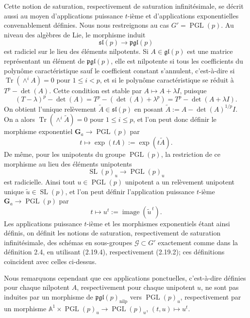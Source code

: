 \documentclass[11pt]{article}
\newcommand{\Ga}{\mathbf G_a}
\newcommand{\nilp}{\mathrm{nilp}}
\newcommand{\SL}{\operatorname{SL}}
\newcommand{\PGL}{\operatorname{PGL}}
\newcommand{\Tr}{\operatorname{Tr}}
\begin{document}
Cette notion de saturation, respectivement de saturation infinitésimale, se décrit aussi
au moyen d'applications puissance \(t\)-ième et d'applications exponentielles convenablement
définies. Nous nous restreignons au cas \(G'=\PGL(p)\). Au niveau des algèbres de Lie,
le morphisme induit
\begin{equation}
  \mathfrak{sl}(p)\longrightarrow\mathfrak{pgl}(p)
  \tag{2.19.1}
\end{equation}
est radiciel sur le lieu des éléments nilpotents. Si \(A\in\mathfrak{gl}(p)\) est une
matrice représentant un élément de \(\mathfrak{pgl}(p)\), elle est nilpotente si tous les
coefficients du polynôme caractéristique sauf le coefficient constant s'annulent, c'est-à-dire
si \(\Tr(\wedge^i A)=0\) pour \(1\le i<p\), et si le polynôme caractéristique se réduit
à \(T^p-\det(A)\). Cette condition est stable par \(A\mapsto A+\lambda I\), puisque
\[
  (T-\lambda)^p-\det(A)=T^p-(\det(A)+\lambda^p)=T^p-\det(A+\lambda I).
\]
On obtient l'unique relèvement \(\widetilde A\in\mathfrak{sl}(p)\) en posant
\(\widetilde A:=A-\det(A)^{1/p}I\). On a alors \(\Tr(\wedge^i\widetilde A)=0\) pour
\(1\le i\le p\), et l'on peut donc définir le morphisme exponentiel
\(\Ga\to\PGL(p)\) par
\begin{equation}
  t\longmapsto \exp(tA):=\exp(t\widetilde A).
  \tag{2.19.2}
\end{equation}
De même, pour les unipotents du groupe \(\PGL(p)\), la restriction de ce morphisme au
lieu des éléments unipotents
\begin{equation}
  \SL(p)_u\longrightarrow\PGL(p)_u
  \tag{2.19.3}
\end{equation}
est radicielle. Ainsi tout \(u\in\PGL(p)\) unipotent a un relèvement unipotent unique
\(\widetilde u\in\SL(p)\), et l'on peut définir l'application puissance \(t\)-ième
\(\Ga\to\PGL(p)\) par
\begin{equation}
  t\longmapsto u^t:=\operatorname{image}(\widetilde u^{\,t}).
  \tag{2.19.4}
\end{equation}
Les applications puissance \(t\)-ième et les morphismes exponentiels étant ainsi définis,
on définit les notions de saturation, respectivement de saturation infinitésimale, des
schémas en sous-groupes \(\mathcal G\subset G'\) exactement comme dans la définition 2.4,
en utilisant (2.19.4), respectivement (2.19.2); ces définitions coïncident avec celles ci-dessus.

Nous remarquons cependant que ces applications ponctuelles, c'est-à-dire définies pour
chaque nilpotent \(A\), respectivement pour chaque unipotent \(u\), ne sont pas induites
par un morphisme de \(\mathfrak{pgl}(p)_{\nilp}\) vers \(\PGL(p)_u\), respectivement par
un morphisme \(\mathbb A^1\times\PGL(p)_u\to\PGL(p)_u\), \((t,u)\mapsto u^t\).
\end{document}
